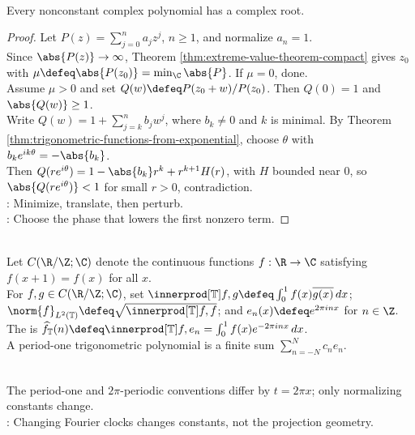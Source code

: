 \begin{theorem} \label{thm:fundamental-theorem-algebra-exponential-proof} \\
Every nonconstant complex polynomial has a complex root.
\begin{proof}
Let $P(z)=\sum_{j=0}^{n}a_jz^j$, $n\geq1$, and normalize $a_n=1$.\\
Since $\abs{P(z)}\to\infty$, Theorem \ref{thm:extreme-value-theorem-compact} gives $z_0$ with $\mu\defeq\abs{P(z_0)}=\min_{\C}\abs{P}$. If $\mu=0$, done.\\
Assume $\mu>0$ and set $Q(w)\defeq P(z_0+w)/P(z_0)$. Then $Q(0)=1$ and $\abs{Q(w)}\geq1$.\\
Write $Q(w)=1+\sum\limits_{j=k}^{n}b_jw^j$, where $b_k\neq0$ and $k$ is minimal. By Theorem \ref{thm:trigonometric-functions-from-exponential}, choose $\theta$ with $b_ke^{ik\theta}=-\abs{b_k}$.\\
Then $Q(re^{i\theta})=1-\abs{b_k}r^k+r^{k+1}H(r)$, with $H$ bounded near $0$, so $\abs{Q(re^{i\theta})}<1$ for small $r>0$, contradiction.\\
: Minimize, translate, then perturb.\\
: Choose the phase that lowers the first nonzero term.
\end{proof}
\end{theorem}

\begin{definition} \label{def:period-one-fourier-normalization} \\
Let $C(\R/\Z;\C)$ denote the continuous functions $f:\R\to\C$ satisfying $f(x+1)=f(x)$ for all $x$. \\
For $f,g\in C(\R/\Z;\C)$, set $\innerprod[\mathbb{T}]{f,g}\defeq \int_0^1 f(x)\overline{g(x)}\,dx$; $\norm{f}_{L^2(\mathbb{T})}\defeq \sqrt{\innerprod[\mathbb{T}]{f,f}}$; and $e_n(x)\defeq e^{2\pi i n x}$ for $n\in\Z$.\\
The  is $\widehat{f}_{\mathbb{T}}(n)\defeq \innerprod[\mathbb{T}]{f,e_n}=\int_0^1 f(x)e^{-2\pi i n x}\,dx$.\\
A period-one trigonometric polynomial is a finite sum $\sum_{n=-N}^{N}c_ne_n$.
\end{definition}

\begin{perspective} \label{per:period-one-versus-two-pi-fourier} \\
The period-one and $2\pi$-periodic conventions differ by $t=2\pi x$; only normalizing constants change.\\
: Changing Fourier clocks changes constants, not the projection geometry.
\end{perspective}

